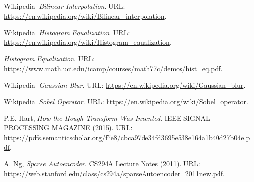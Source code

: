 \begin{thebibliography}{3}
Wikipedia,
\emph{Bilinear Interpolation}.
URL: \url{https://en.wikipedia.org/wiki/Bilinear_interpolation}.

Wikipedia,
\emph{Histogram Equalization}.
URL: \url{https://en.wikipedia.org/wiki/Histogram_equalization}.


\emph{Histogram Equalization}.
URL: \url{https://www.math.uci.edu/icamp/courses/math77c/demos/hist_eq.pdf}.


Wikipedia,
\emph{Gaussian Blur}.
URL: \url{https://en.wikipedia.org/wiki/Gaussian_blur}.


Wikipedia,
\emph{Sobel Operator}.
URL: \url{https://en.wikipedia.org/wiki/Sobel_operator}.


P.E. Hart,
\emph{How the Hough Transform Was Invented}.
IEEE SIGNAL PROCESSING MAGAZINE
(2015).
URL: \url{https://pdfs.semanticscholar.org/f7e8/cbca97de34fd3695e538e164a1b40d27b04e.pdf}.




A. Ng,
\emph{Sparse Autoencoder}.
CS294A Lecture Notes
(2011).
URL: \url{https://web.stanford.edu/class/cs294a/sparseAutoencoder_2011new.pdf}.








\end{thebibliography}
